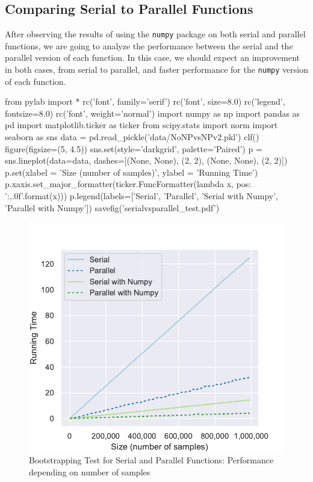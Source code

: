 \documentclass[11pt]{article}
\begin{document}
\subsection{Comparing Serial to Parallel Functions}

After observing the results of using the \texttt{numpy} package on both serial and parallel functions, we are going to
analyze the performance between the serial and the parallel version of each function. In this case, we should expect an
improvement in both cases, from serial to parallel, and faster performance for the \texttt{numpy} version of each function.

\begin{pycode}
from pylab import *
rc('font', family='serif')
rc('font', size=8.0)
rc('legend', fontsize=8.0)
rc('font', weight='normal')
import numpy as np
import pandas as pd
import matplotlib.ticker as ticker
from scipy.stats import norm
import seaborn as sns
data = pd.read_pickle('data/NoNPvsNPv2.pkl')
clf()
figure(figsize=(5, 4.5))
sns.set(style='darkgrid', palette='Paired')
p = sns.lineplot(data=data, dashes=[(None, None), (2, 2), (None, None), (2, 2)])
p.set(xlabel = 'Size (number of samples)', ylabel = 'Running Time')
p.xaxis.set_major_formatter(ticker.FuncFormatter(lambda x, pos: '{:,.0f}'.format(x)))
p.legend(labels=['Serial', 'Parallel', 'Serial with Numpy', 'Parallel with Numpy'])
savefig('serialvsparallel_test.pdf')
\end{pycode}

\begin{figure}[H]
    \begin{center}
        \includegraphics{serialvsparallel_test.pdf}
    \end{center}
    \caption{Bootstrapping Test for Serial and Parallel Functions: Performance depending on number of samples}\label{fig:SerialVSParallelTest}
\end{figure}
\end{document}
